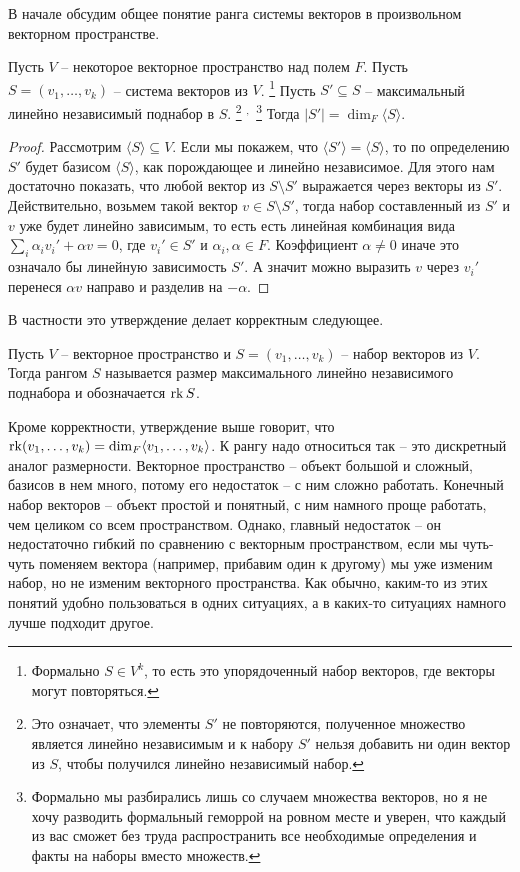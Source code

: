 В начале обсудим общее понятие ранга системы векторов в произвольном векторном пространстве.

\begin{claim}
Пусть $V$ -- некоторое векторное пространство над полем $F$.
Пусть $S = (v_1,\ldots,v_k) $ -- система векторов из $V$.%
\footnote{Формально $S\in V^k$, то есть это упорядоченный набор векторов, где векторы могут повторяться.}
Пусть $S'\subseteq S$ -- максимальный линейно независимый поднабор в $S$.%
\footnote{Это означает, что элементы $S'$ не повторяются, полученное множество является линейно независимым и к набору $S'$ нельзя добавить ни один вектор из $S$, чтобы получился линейно независимый набор.}%
${}^{,\,}$%
\footnote{Формально мы разбирались лишь со случаем множества векторов, но я не хочу разводить формальный геморрой на ровном месте и уверен, что каждый из вас сможет без труда распространить все необходимые определения и факты на наборы вместо множеств.} Тогда $|S'| = \dim_F \langle S\rangle$.
\end{claim}
\begin{proof}
Рассмотрим $\langle S \rangle\subseteq V$.
Если мы покажем, что $\langle S' \rangle = \langle S \rangle$, то по определению $S'$ будет базисом $\langle S\rangle$, как порождающее и линейно независимое.
Для этого нам достаточно показать, что любой вектор из $S\setminus S'$ выражается через векторы из $S'$.
Действительно, возьмем такой вектор $v\in S\setminus S'$, тогда набор составленный из $S'$ и $v$ уже будет линейно зависимым, то есть есть линейная комбинация вида $\sum_i\alpha_i v_i' + \alpha v = 0$, где  $v_i'\in S'$ и $\alpha_i,\alpha\in F$.
Коэффициент $\alpha\neq 0$ иначе это означало бы линейную зависимость $S'$.
А значит можно выразить $v$ через $v_i'$ перенеся $\alpha v $ направо и разделив на $-\alpha$.
\end{proof}

В частности это утверждение делает корректным следующее.

\begin{definition}
Пусть $V$ -- векторное пространство и $S = (v_1,\ldots,v_k)$ -- набор векторов из $V$.
Тогда рангом $S$ называется размер максимального линейно независимого поднабора и обозначается $\operatorname{rk} S$.
\end{definition}

Кроме корректности, утверждение выше говорит, что $\operatorname{rk} (v_1,\ldots,v_k) = \dim_F \langle v_1, \ldots,v_k\rangle$.
К рангу надо относиться так -- это дискретный аналог размерности.
Векторное пространство -- объект большой и сложный, базисов в нем много, потому его недостаток -- с ним сложно работать.
Конечный набор векторов -- объект простой и понятный, с ним намного проще работать, чем целиком со всем пространством.
Однако, главный недостаток -- он недостаточно гибкий по сравнению с векторным пространством, если мы чуть-чуть поменяем вектора (например, прибавим один к другому) мы уже изменим набор, но не изменим векторного пространства.
Как обычно, каким-то из этих понятий удобно пользоваться в одних ситуациях, а в каких-то ситуациях намного лучше подходит другое.


